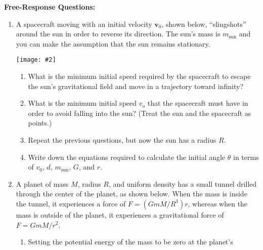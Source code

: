 \documentclass[12pt]{article}
\newcommand{\pic}[2]{\texttt{[image: \#2]}}
\newcommand{\mb}[1]{\mathbf{#1}}
\begin{document}
\newpage
\noindent\textbf{Free-Response Questions:}

\begin{enumerate}[leftmargin=15pt]

\item A spacecraft moving with an initial velocity $\mb{v}_0$, shown below,
  ``slingshots'' around the sun in order to reverse its direction. The sun's
  mass is $m_\mathrm{sun}$ and you can make the assumption that the sun remains
  stationary.\\
  \begin{minipage}{0.28\textwidth}
    \pic{1.25}{shuttle.jpg}
  \end{minipage}
  \begin{minipage}{0.7\textwidth}
    \begin{enumerate}[noitemsep]
    \item What is the minimum initial speed required by the spacecraft to escape
      the sun's gravitational field and move in a trajectory toward infinity?
    \item What is the minimum initial speed $v_o$ that the spacecraft must have
      in order to avoid falling into the sun? (Treat the sun and the spacecraft
      as points.)
    \item Repeat the previous questions, but now the sun has a radius $R$.
    \item Write down the equations required to calculate the initial angle
      $\theta$ in terms of $v_0$, $d$, $m_\mathrm{sun}$, $G$, and $r$.
    \end{enumerate}
  \end{minipage}
  \newpage
\item A planet of mass $M$, radius $R$, and uniform density has a small tunnel
  drilled through the center of the planet, as shown below. When the mass is
  inside the tunnel, it experiences a force of $F=(GmM/R^3)r$, whereas when the
  mass is outside of the planet, it experiences a gravitational force of
  $F=GmM/r^2$.
  \begin{center}
  \end{center}
  \begin{enumerate}[noitemsep,leftmargin=20pt]
  \item Setting the potential energy of the mass to be zero at the planet's

\end{enumerate}
\end{enumerate}
\end{document}

